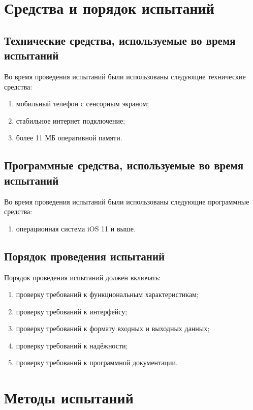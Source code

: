 \documentclass{../includes/TechDoc}
\begin{document}
    \section{Средства и порядок испытаний}

    \subsection{Технические средства, используемые во время испытаний}

    Во время проведения испытаний были использованы следующие технические средства:
    \begin{enumerate}
        \item мобильный телефон с сенсорным экраном;
        \item стабильное интернет подключение;
        \item более 11 МБ оперативной памяти.
    \end{enumerate}

    \subsection{Программные средства, используемые во время испытаний}

    Во время проведения испытаний были использованы следующие программные средства:
    \begin{enumerate}
        \item операционная система iOS 11 и выше.
    \end{enumerate}

    \subsection{Порядок проведения испытаний}

    Порядок проведения испытаний должен включать:
    \begin{enumerate}
        \item проверку требований к функциональным характеристикам;
        \item проверку требований к интерфейсу;
        \item проверку требований к формату входных и выходных данных;
        \item проверку требований к надёжности;
        \item проверку требований к программной документации.
    \end{enumerate}


    \section{Методы испытаний}
\end{document}
